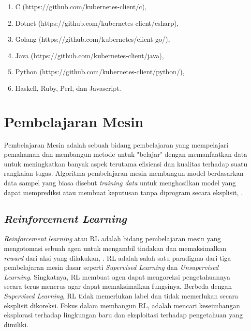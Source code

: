 \begin{enumerate}
    \item C (https://github.com/kubernetes-client/c),
    \item Dotnet (https://github.com/kubernetes-client/csharp),
    \item Golang (https://github.com/kubernetes/client-go/),
    \item Java (https://github.com/kubernetes-client/java),
    \item Python (https://github.com/kubernetes-client/python/),
    \item Haskell, Ruby, Perl, dan Javascript.
\end{enumerate}

\section{Pembelajaran Mesin}
Pembelajaran Mesin adalah sebuah bidang pembelajaran yang mempelajari pemahaman dan membangun metode untuk "belajar" dengan memanfaatkan data untuk meningkatkan banyak aspek terutama efisiensi dan kualitas terhadap suatu rangkaian tugas. Algoritma pembelajaran mesin membangun model berdasarkan data sampel yang biasa disebut \textit{training data} untuk menghasilkan model yang dapat memprediksi atau membuat keputusan tanpa diprogram secara eksplisit, \parencite{ml}.

\subsection{\textit{Reinforcement Learning}}
\textit{Reinforcement learning} atau RL adalah bidang pembelajaran mesin yang mengotomasi sebuah agen untuk mengambil tindakan dan memaksimalkan \textit{reward} dari aksi yang dilakukan, \parencite{reinforcementlearning}. RL adalah salah satu paradigma dari tiga pembelajaran mesin dasar seperti \textit{Supervised Learning} dan \textit{Unsupervised Learning}. Singkatnya, RL membuat agen dapat mengoreksi pengetahuannya secara terus menerus agar dapat memaksimalkan fungsinya. Berbeda dengan \textit{Supervised Learning}, RL tidak memerlukan label dan tidak memerlukan secara eksplisit dikoreksi. Fokus dalam membangun RL, adalah mencari keseimbangan eksplorasi terhadap lingkungan baru dan eksploitasi terhadap pengetahuan yang dimiliki.